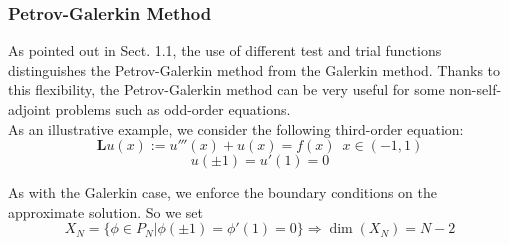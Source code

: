 \subsubsection{Petrov-Galerkin Method}

As pointed out in Sect. 1.1, the use of different test and trial functions distinguishes the Petrov-Galerkin method from the Galerkin method. Thanks to this flexibility, the Petrov-Galerkin method can be very useful for some non-self-adjoint problems such as odd-order equations. \\
\indent As an illustrative example, we consider the following third-order equation:
\begin{equation}
	\mathbf{ L } u(x) := u'''(x) + u(x) = f(x)\, \hspace{4pt} x \in (-1,1)
\end{equation}
\[
	u( \pm 1) = u'(1) = 0
\]

As with the Galerkin case, we enforce the boundary conditions on the approximate solution. So we set
\[
	X_{ N } = \{ \phi \in P_{ N } \vert \phi( \pm 1) = \phi' (1) = 0 \} \Rightarrow \dim (X_{ N }) = N-2
\]



